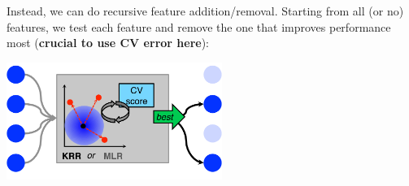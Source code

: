 Instead, we can do recursive feature addition/removal. Starting from all (or no) features, we test each feature and remove the one that improves performance most (\textbf{crucial to use CV error here}):
\pause{}
\begin{center}
	\includegraphics[width=7.0cm]{representations/images/wrap}
\end{center}
